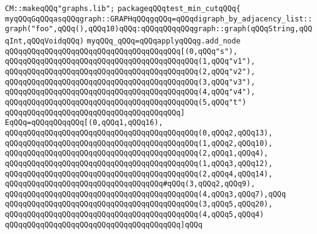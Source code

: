 \label{src/lib/graph/test3.pkg}
\verb|CM::makeqQQq"graphs.lib";|\newline
\verb|packageqQQqtest_min_cutqQQq{|\newline
\newline
\verb|myqQQqGqQQqasqQQqgraph::GRAPHqQQqgqQQq=qQQqdigraph_by_adjacency_list::graph("foo",qQQq(),qQQq10)qQQq:qQQqqQQqqQQqgraph::graph(qQQqString,qQQqInt,qQQqVoidqQQq)|\newline
\newline
\verb|myqQQq_qQQq=qQQqapplyqQQqg.add_node|\newline
\verb|qQQqqQQqqQQqqQQqqQQqqQQqqQQqqQQqqQQqqQQq[(0,qQQq"s"),|\newline
\verb|qQQqqQQqqQQqqQQqqQQqqQQqqQQqqQQqqQQqqQQqqQQq(1,qQQq"v1"),|\newline
\verb|qQQqqQQqqQQqqQQqqQQqqQQqqQQqqQQqqQQqqQQqqQQq(2,qQQq"v2"),|\newline
\verb|qQQqqQQqqQQqqQQqqQQqqQQqqQQqqQQqqQQqqQQqqQQq(3,qQQq"v3"),|\newline
\verb|qQQqqQQqqQQqqQQqqQQqqQQqqQQqqQQqqQQqqQQqqQQq(4,qQQq"v4"),|\newline
\verb|qQQqqQQqqQQqqQQqqQQqqQQqqQQqqQQqqQQqqQQqqQQq(5,qQQq"t")|\newline
\verb|qQQqqQQqqQQqqQQqqQQqqQQqqQQqqQQqqQQqqQQq]|\newline
\verb|EqQQq=qQQqqQQqqQQq[(0,qQQq1,qQQq16),|\newline
\verb|qQQqqQQqqQQqqQQqqQQqqQQqqQQqqQQqqQQqqQQqqQQq(0,qQQq2,qQQq13),|\newline
\verb|qQQqqQQqqQQqqQQqqQQqqQQqqQQqqQQqqQQqqQQqqQQq(1,qQQq2,qQQq10),|\newline
\verb|qQQqqQQqqQQqqQQqqQQqqQQqqQQqqQQqqQQqqQQqqQQq(2,qQQq1,qQQq4),|\newline
\verb|qQQqqQQqqQQqqQQqqQQqqQQqqQQqqQQqqQQqqQQqqQQq(1,qQQq3,qQQq12),|\newline
\verb|qQQqqQQqqQQqqQQqqQQqqQQqqQQqqQQqqQQqqQQqqQQq(2,qQQq4,qQQq14),|\newline
\verb|qQQqqQQqqQQqqQQqqQQqqQQqqQQqqQQqqQQq#qQQq(3,qQQq2,qQQq9),|\newline
\verb|qQQqqQQqqQQqqQQqqQQqqQQqqQQqqQQqqQQqqQQqqQQq(4,qQQq3,qQQq7),qQQq|\newline
\verb|qQQqqQQqqQQqqQQqqQQqqQQqqQQqqQQqqQQqqQQqqQQq(3,qQQq5,qQQq20),|\newline
\verb|qQQqqQQqqQQqqQQqqQQqqQQqqQQqqQQqqQQqqQQqqQQq(4,qQQq5,qQQq4)|\newline
\verb|qQQqqQQqqQQqqQQqqQQqqQQqqQQqqQQqqQQqqQQq]qQQq|\newline
